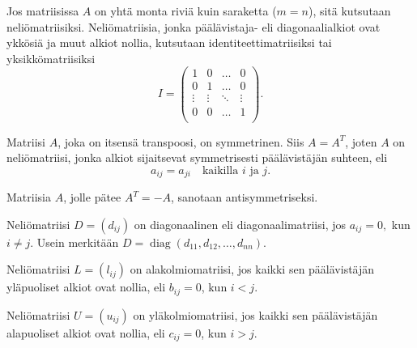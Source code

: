 \documentclass[a4paper, 12pt]{article}
\theoremstyle{remark}
\theoremstyle{definition}
\DeclareMathOperator{\diag}{diag}
\begin{document}
\begin{maar}[Neliömatriisi]
Jos matriisissa $A$ on yhtä monta riviä kuin saraketta ($m=n$), sitä kutsutaan neliömatriisiksi. Neliömatriisia, jonka päälävistaja- eli diagonaalialkiot ovat ykkösiä ja muut alkiot nollia, kutsutaan identiteettimatriisiksi tai yksikkömatriisiksi
$$
I=\begin{pmatrix}
1 & 0 & \dots & 0\\
0 & 1 & \dots & 0\\
\vdots & \vdots & \ddots & \vdots\\
0 & 0 & \dots & 1\\
\end{pmatrix}.
$$
\end{maar}

\begin{maar} Matriisi $A$, joka on itsensä transpoosi, on symmetrinen. Siis $A=A^T$, joten $A$ on neliömatriisi, jonka alkiot sijaitsevat symmetrisesti päälävistäjän suhteen, eli
$$a_{ij}=a_{ji}\quad\text{kaikilla }i \text{ ja }j.$$

Matriisia $A$, jolle pätee $A^T=-A$, sanotaan antisymmetriseksi.
\end{maar}

\begin{maar} Neliömatriisi $D=(d_{ij})$ on diagonaalinen eli diagonaalimatriisi, jos $a_{ij}=0,$ kun $i\neq j.$ Usein merkitään $D=\diag(d_{11}, d_{12},\ldots, d_{nn}).$

Neliömatriisi $L=(l_{ij})$ on alakolmiomatriisi, jos kaikki sen päälävistäjän yläpuoliset alkiot ovat nollia, eli
$b_{ij}=0$, kun $i<j.$

Neliömatriisi $U=(u_{ij})$ on yläkolmiomatriisi, jos kaikki sen päälävistäjän alapuoliset alkiot ovat nollia, eli
$c_{ij}=0$, kun $i>j.$
\end{maar}
\end{document}
